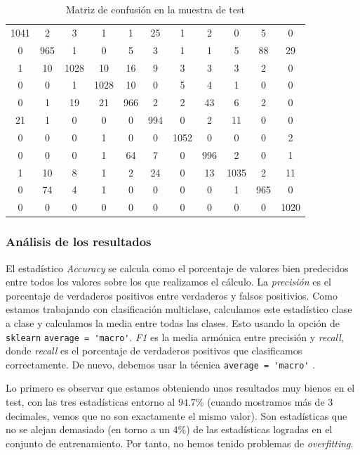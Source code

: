 \documentclass[11pt]{article}
\begin{document}
\begin{table}[H]
\centering
    \begin{tabular}{|c|c|c|c|c|c|c|c|c|c|c|}
    \hline
1041&    2&    3&    1&    1&   25&    1&    2&    0&    5&     0 \\
   0&  965&    1&    0&    5&    3&    1&    1&    5&   88&    29 \\
   1&   10& 1028&   10&   16&    9&    3&    3&    3&    2&     0 \\
   0&    0&    1& 1028&   10&    0&    5&    4&    1&    0&     0 \\
   0&    1&   19&   21&  966&    2&    2&   43&    6&    2&     0 \\
  21&    1&    0&    0&    0&  994&    0&    2&   11&    0&     0 \\
   0&    0&    0&    1&    0&    0& 1052&    0&    0&    0&     2 \\
   0&    0&    0&    1&   64&    7&    0&  996&    2&    0&     1 \\
   1&   10&    8&    1&    2&   24&    0&   13& 1035&    2&    11 \\
   0&   74&    4&    1&    0&    0&    0&    0&    1&  965&     0 \\
   0&    0&    0&    0&    0&    0&    0&    0&    0&    0&  1020 \\
   \hline
\end{tabular}
\caption{Matriz de confusión en la muestra de test}
\end{table}

\subsubsection{Análisis de los resultados}

El estadístico \emph{Accuracy} se calcula como el porcentaje de valores bien predecidos entre todos los valores sobre los que realizamos el cálculo. La \emph{precisión} es el porcentaje de verdaderos positivos entre verdaderos y falsos positivios. Como estamos trabajando con clasificación multiclase, calculamos este estadístico clase a clase y calculamos la media entre todas las clases. Esto usando la opción de \lstinline{sklearn} \lstinline{average = 'macro'}. \emph{F1} es la media armónica entre precisión y \emph{recall}, donde \emph{recall} es el porcentaje de verdaderos positivos que clasificamos correctamente. De nuevo, debemos usar la técnica \lstinline{average = 'macro'} \cite{towards_scores:online}.

Lo primero es observar que estamos obteniendo unos resultados muy bienos en el test, con las tres estadísticas entorno al $94.7\%$ (cuando mostramos más de 3 decimales, vemos que no son exactamente el mismo valor). Son estadísticas que no se alejan demasiado (en torno a un 4\%) de las estadísticas logradas en el conjunto de entrenamiento. Por tanto, no hemos tenido problemas de \emph{overfitting}.
\end{document}
